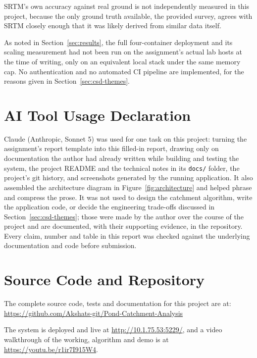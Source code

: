 \documentclass[manuscript,screen,review]{acmart}
\begin{document}
SRTM's own accuracy against real ground is not independently measured in this project,
because the only ground truth available, the provided survey, agrees with SRTM closely
enough that it was likely derived from similar data itself.

As noted in Section~\ref{sec:results}, the full four-container deployment and its
scaling measurement had not been run on the assignment's actual lab hosts at the time
of writing, only on an equivalent local stack under the same memory cap. No
authentication and no automated CI pipeline are implemented, for the reasons given in
Section~\ref{sec:csd-themes}.

\section{AI Tool Usage Declaration}
\label{sec:ai-usage}

Claude (Anthropic, Sonnet 5) was used for one task on this project: turning the
assignment's report template into this filled-in report, drawing only on documentation
the author had already written while building and testing the system, the project
README and the technical notes in its \texttt{docs/} folder, the project's git history,
and screenshots generated by the running application. It also assembled the
architecture diagram in Figure~\ref{fig:architecture} and helped phrase and compress
the prose. It was not used to design the catchment algorithm, write the application
code, or decide the engineering trade-offs discussed in Section~\ref{sec:csd-themes};
those were made by the author over the course of the project and are documented, with
their supporting evidence, in the repository. Every claim, number and table in this
report was checked against the underlying documentation and code before submission.

\appendix

\section{Source Code and Repository}
The complete source code, tests and documentation for this project are at:
\url{https://github.com/Akshats-git/Pond-Catchment-Analysis}

The system is deployed and live at \url{http://10.1.75.53:5229/}, and a video
walkthrough of the working, algorithm and demo is at \url{https://youtu.be/r1ir7I915W4}.
\end{document}
